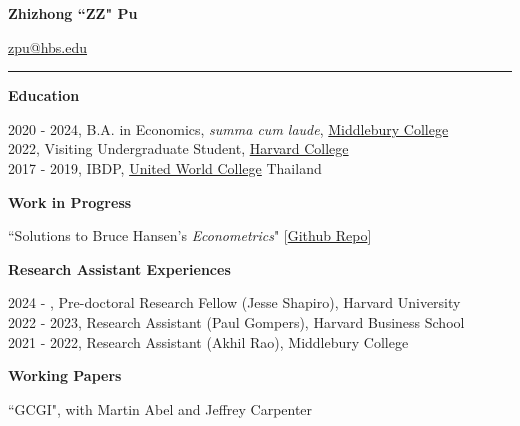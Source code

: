 \documentclass{article}
\begin{document}
{\Large \textbf{Zhizhong ``ZZ" Pu}\par}
    \href{mailto:zpu@hbs.edu}{zpu@hbs.edu} \href{https://github.com/zhizhongpu}{\faGithub} \hspace{0.2em} \\
    \vspace{-0.1in}
    \rule{\textwidth}{1pt}
    \vspace{0in}

{\Large \textbf{Education}}\\
    \vspace{-0.15in}
	\begin{adjustwidth}{1.5em}{0pt}
        2020 - 2024, B.A. in Economics, \textit{summa cum laude}, \href{http://www.middlebury.edu/}{Middlebury College}\\
        2022, Visiting Undergraduate Student, \href{http://www.harvard.edu/}{Harvard College}\\
        2017 - 2019, IBDP, \href{https://www.uwc.org/about}{United World College} Thailand
    \end{adjustwidth}
    \vspace{0.1in}


{\Large \textbf{Work in Progress}}\\
    \vspace{-0.15in}
	\begin{adjustwidth}{1.5em}{0pt}     
        ``Solutions to Bruce Hansen's \textit{Econometrics}" [\href{https://github.com/zhizhongpu/solutions_econometrics_hansen}{Github Repo}]
    \end{adjustwidth}
    \vspace{0.1in}
	
{\Large \textbf{Research Assistant Experiences}}
\begin{adjustwidth}{1.5em}{0pt}
    2024 - , Pre-doctoral Research Fellow (Jesse Shapiro), Harvard University \\
    2022 - 2023, Research Assistant (Paul Gompers), Harvard Business School \\
    2021 - 2022, Research Assistant (Akhil Rao), Middlebury College
\end{adjustwidth}
\vspace{0.1in}


{\Large \textbf{Working Papers}}\\
    \vspace{-0.15in}
	\begin{adjustwidth}{1.5em}{0pt}
     ``GCGI", with Martin Abel and Jeffrey Carpenter
    \end{adjustwidth}
	\vspace{0.1in}
\end{document}

